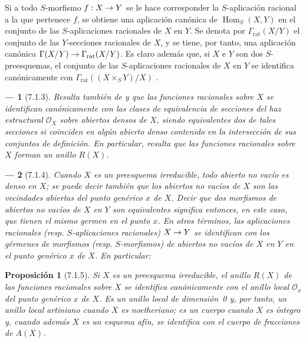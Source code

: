\documentclass[oneside]{amsart}
\theoremstyle{ega-env-style}
\newtheorem*{env}{---}
\theoremstyle{ega-thm-env-style}
\newtheorem*{proposition}{Proposición}
\theoremstyle{ega-defn-env-style}
\renewcommand{\to}{\mathchoice{\longrightarrow}{\rightarrow}{\rightarrow}{\rightarrow}}
\newcommand{\oldpage}[2][]{{\marginnote{\normalfont{\textbf{#1}~|~#2}}}\ignorespaces}
\let\EGAOriginalLabel\label
\renewcommand{\label}[1]{\phantomsection\EGAOriginalLabel{#1}}
\begin{document}
Si a todo $S$-morfismo $f:X\to Y$ se le hace corresponder la $S$-aplicación racional
\oldpage[I]{156}
a la que pertenece $f$, se obtiene una aplicación canónica de $\operatorname{Hom}_S(X,Y)$ en el conjunto de las $S$-aplicaciones racionales de $X$ en $Y$.
Se denota por $\Gamma_{\mathrm{rat}}(X/Y)$ el conjunto de las $Y$-secciones racionales de $X$, y se tiene, por tanto, una aplicación canónica $\Gamma(X/Y)\to\Gamma_{\mathrm{rat}}(X/Y)$.
Es claro además que, si $X$ e $Y$ son dos $S$-preesquemas, el conjunto de las $S$-aplicaciones racionales de $X$ en $Y$ se identifica canónicamente con $\Gamma_{\mathrm{rat}}((X\times_S Y)/X)$ .


\begin{env}[7.1.3]
\label{I.7.1.3}
Resulta también de  y  que las funciones racionales sobre $X$ se identifican canónicamente con las \emph{clases de equivalencia de secciones del haz estructural $\mathscr{O}_X$} sobre abiertos densos de $X$, siendo equivalentes dos de tales secciones si coinciden en algún abierto denso contenido en la intersección de sus conjuntos de definición.
En particular, resulta que las funciones racionales sobre $X$ forman un \emph{anillo} $R(X)$.
\end{env}

\begin{env}[7.1.4]
\label{I.7.1.4}
Cuando $X$ es un preesquema \emph{irreducible}, todo abierto no vacío es denso en $X$; se puede decir también que los abiertos no vacíos de $X$ son las \emph{vecindades abiertas del punto genérico} $x$ de $X$.
Decir que dos morfismos de abiertos no vacíos de $X$ en $Y$ son equivalentes significa entonces, en este caso, que tienen el \emph{mismo germen} en el punto $x$.
En otros términos, las aplicaciones racionales (resp. $S$-aplicaciones racionales) $X\to Y$ se identifican con los \emph{gérmenes de morfismos} (resp. \emph{$S$-morfismos}) de abiertos no vacíos de $X$ en $Y$ en el punto genérico $x$ de $X$.
En particular:
\end{env}

\begin{proposition}[7.1.5]
\label{I.7.1.5}
Si $X$ es un preesquema irreducible, el anillo $R(X)$ de las funciones racionales sobre $X$ se identifica canónicamente con el anillo local $\mathscr{O}_x$ del punto genérico $x$ de $X$.
Es un anillo local de dimensión~\textup{0} y, por tanto, un anillo local artiniano cuando $X$ es noetheriano; es un cuerpo cuando $X$ es íntegro y, cuando además $X$ es un esquema afín, se identifica con el cuerpo de fracciones de $A(X)$.
\end{proposition}
\end{document}
